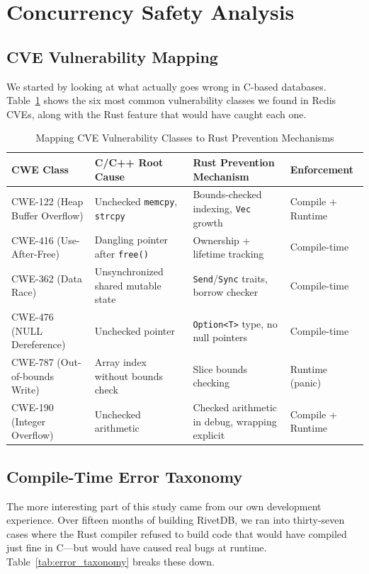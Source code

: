 \documentclass[conference,a4paper]{IEEEtran}
\begin{document}
\section{Concurrency Safety Analysis}

\subsection{CVE Vulnerability Mapping}

We started by looking at what actually goes wrong in C-based databases. Table~\ref{tab:cve_mapping} shows the six most common vulnerability classes we found in Redis CVEs, along with the Rust feature that would have caught each one.

\begin{table}[htbp]
\caption{Mapping CVE Vulnerability Classes to Rust Prevention Mechanisms}
\label{tab:cve_mapping}
\centering
\begin{tabular}{@{}llll@{}}
\toprule
\textbf{CWE Class} & \textbf{C/C++ Root Cause} & \textbf{Rust Prevention Mechanism} & \textbf{Enforcement} \\
\midrule
CWE-122 (Heap Buffer Overflow) & Unchecked \texttt{memcpy}, \texttt{strcpy} & Bounds-checked indexing, \texttt{Vec} growth & Compile + Runtime \\
CWE-416 (Use-After-Free) & Dangling pointer after \texttt{free()} & Ownership + lifetime tracking & Compile-time \\
CWE-362 (Data Race) & Unsynchronized shared mutable state & \texttt{Send}/\texttt{Sync} traits, borrow checker & Compile-time \\
CWE-476 (NULL Dereference) & Unchecked pointer & \texttt{Option\textless T\textgreater} type, no null pointers & Compile-time \\
CWE-787 (Out-of-bounds Write) & Array index without bounds check & Slice bounds checking & Runtime (panic) \\
CWE-190 (Integer Overflow) & Unchecked arithmetic & Checked arithmetic in debug, wrapping explicit & Compile + Runtime \\
\bottomrule
\end{tabular}
\end{table}

\subsection{Compile-Time Error Taxonomy}

The more interesting part of this study came from our own development experience. Over fifteen months of building RivetDB, we ran into thirty-seven cases where the Rust compiler refused to build code that would have compiled just fine in C---but would have caused real bugs at runtime. Table~\ref{tab:error_taxonomy} breaks these down.
\end{document}
